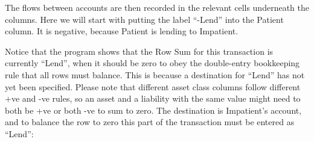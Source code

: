 \begin{center}
\par\end{center}

The flows between accounts are then recorded in the relevant cells
underneath the columns. Here we will start with putting the label
``-Lend'' into the Patient column. It is negative, because Patient
is lending to Impatient.


\begin{center}
\par\end{center}

Notice that the program shows that the Row Sum for this transaction
is currently ``Lend'', when it should be zero to obey the double-entry
bookkeeping rule that all rows must balance. This is because a destination
for ``Lend'' has not yet been specified. Please note that different
asset class columns follow different +ve and -ve rules, so an asset
and a liability with the same value might need to both be +ve or both
-ve to sum to zero. The destination is Impatient's account, and to
balance the row to zero this part of the transaction must be entered
as ``Lend'':

